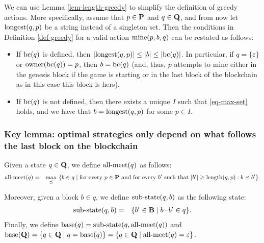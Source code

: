 We can use Lemma \ref{lem-length-greedy} to simplify the definition of greedy actions. More specifically, assume that $p \in \mathbf{P}$ and $q \in \mathbf{Q}$, and from now let ${\text{\rm longest}}(q,p)$ be a string instead of a singleton set. Then the conditions in Definition \ref{def-greedy} for a valid action $\text{\rm mine}(p,b,q)$ can be restated as follows:
\begin{itemize}
\item If $\text{bc}(q)$ is defined, then $|{\text{\rm longest}}(q,p)| \leq |b|  \leq |\text{bc}(q)|$. In particular, 
if $q = \{\varepsilon\}$ or $\text{\rm owner}(\text{bc}(q)) = p$, then $b = \text{bc}(q)$ (and, thus, $p$ attempts to mine either in the genesis block if the game is starting or in the last block of the blockchain as in this case this block is hers).



\item If $\text{bc}(q)$ is not defined, then there exists a unique $I$ such that \eqref{eq-max-set} holds, and we have that $b = {\text{\rm longest}}(q,p)$ for some $p \in I$.
\end{itemize}



\subsubsection{Key lemma: optimal strategies only depend on what follows the last block on the blockchain}

Given a state $q \in \mathbf{Q}$, we define $\text{\rm all-meet}(q)$ as follows:
\begin{eqnarray*}
\text{\rm all-meet}(q)  & =  & \max_{\preceq} \ \{b \in q \mid \text{for every } p\in \mathbf{P} \text{ and for every } b' \text{ such that } |b'| \geq \text{\rm length}(q,p): b \preceq b'\}.
\end{eqnarray*}

Moreover, given a block $b \in q$, we define ${\text{\rm sub-state}}(q,b)$ as the following state:
\begin{eqnarray*}
{\text{\rm sub-state}}(q,b) & = & \{ b' \in \mathbf{B} \mid b \cdot b' \in q\}.
\end{eqnarray*}
Finally, 
we define $\text{\rm base}(q) = {\text{\rm sub-state}}(q,\text{\rm all-meet}(q))$ 
and $\text{\rm base}(\mathbf{Q}) = \{q \in \mathbf{Q} \mid q = \text{\rm base}(q)\} = \{q \in \mathbf{Q} \mid \text{\rm all-meet}(q) = \varepsilon \}$.

